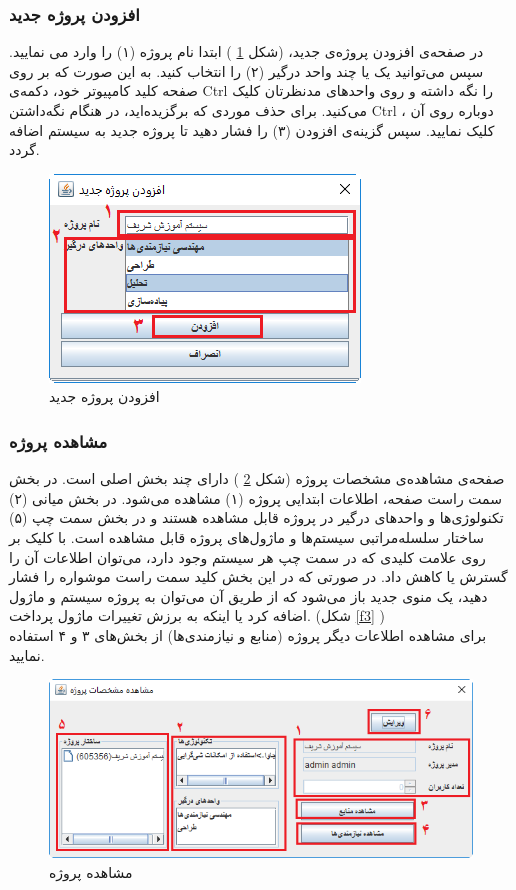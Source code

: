 \subsubsection{افزودن پروژه جدید}

در صفحه‌ی افزودن پروژه‌ی جدید، (شکل
\ref{f1}
)
ابتدا نام پروژه (۱) را وارد می نمایید. سپس می‌توانید  یک یا چند واحد درگیر (۲) را انتخاب کنید. به این صورت که بر روی صفحه کلید کامپیوتر خود، دکمه‌ی Ctrl را نگه داشته و روی واحدهای مدنظرتان کلیک می‌کنید. برای حذف موردی که برگزیده‌اید، در هنگام نگه‌داشتن Ctrl ، دوباره روی آن کلیک نمایید. سپس گزینه‌ی افزودن (۳) را فشار دهید تا پروژه جدید به سیستم اضافه گردد.

\begin{figure}[H]
	\centering
	\includegraphics[scale=0.8]{img/manual/addProject}
	\caption{افزودن پروژه جدید}
	\label{f1}
\end{figure}

\subsubsection{مشاهده پروژه}
صفحه‌ی مشاهده‌ی مشخصات پروژه (شکل
\ref{f2}
)
دارای چند بخش اصلی است. در بخش سمت راست صفحه، اطلاعات ابتدایی پروژه (۱) مشاهده می‌شود. در بخش میانی (۲) تکنولوژی‌ها و واحدهای درگیر در پروژه قابل مشاهده هستند و در بخش سمت چپ (۵) ساختار سلسله‌مراتبی سیستم‌ها و ماژول‌های پروژه قابل مشاهده است. با کلیک بر روی علامت کلیدی که در سمت چپ هر سیستم وجود دارد، می‌توان اطلاعات آن را گسترش یا کاهش داد. در صورتی که در این بخش کلید سمت راست موشواره را فشار دهید، یک منوی جدید باز می‌شود که از طریق آن می‌توان به پروژه سیستم و ماژول اضافه کرد یا اینکه به برزش تغییرات ماژول پرداخت. (شکل
\ref{f3}
) \\
برای مشاهده اطلاعات دیگر پروژه (منابع و نیازمندی‌ها) از بخش‌های ۳ و ۴ استفاده نمایید.
\begin{figure}[H]
	\centering
	\includegraphics[scale=0.8]{img/manual/projectAttr}
	\caption{مشاهده پروژه}
	\label{f2}
	\end{figure}	

